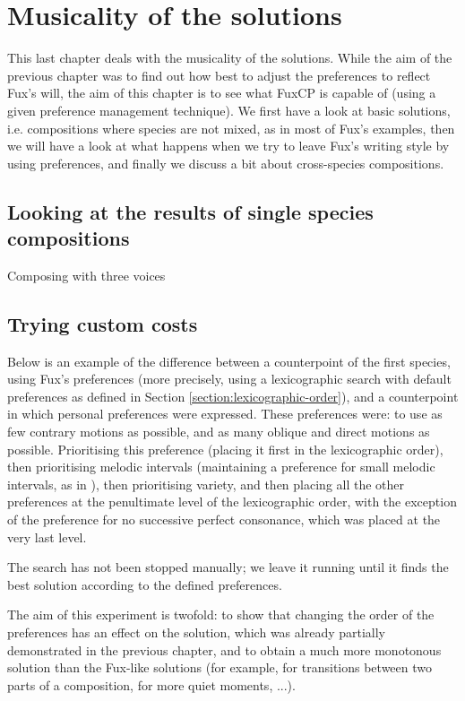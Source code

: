 \chapter{Musicality of the solutions}
This last chapter deals with the musicality of the solutions. While the aim of the previous chapter was to find out how best to adjust the preferences to reflect Fux's will, the aim of this chapter is to see what FuxCP is capable of (using a given preference management technique). We first have a look at basic solutions, i.e. compositions where species are not mixed, as in most of Fux's examples, then we will have a look at what happens when we try to leave Fux's writing style by using preferences, and finally we discuss a bit about cross-species compositions.

\section{Looking at the results of single species compositions}
Composing with three voices

\section{Trying custom costs}
Below is an example of the difference between a counterpoint of the first species, using Fux's preferences (more precisely, using a lexicographic search with default preferences as defined in Section \ref{section:lexicographic-order}), and a counterpoint in which personal preferences were expressed. These preferences were: to use as few contrary motions as possible, and as many oblique and direct motions as possible. Prioritising this preference (placing it first in the lexicographic order), then prioritising melodic intervals (maintaining a preference for small melodic intervals, as in \gap), then prioritising variety, and then placing all the other preferences at the penultimate level of the lexicographic order, with the exception of the preference for no successive perfect consonance, which was placed at the very last level.

The search has not been stopped manually; we leave it running until it finds the best solution according to the defined preferences.

The aim of this experiment is twofold: to show that changing the order of the preferences has an effect on the solution, which was already partially demonstrated in the previous chapter, and to obtain a much more monotonous solution than the Fux-like solutions (for example, for transitions between two parts of a composition, for more quiet moments, ...).

